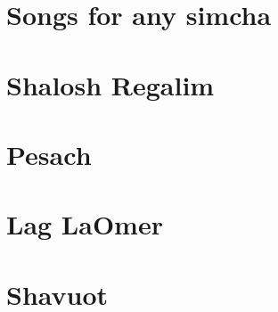 \documentclass[letterpaper]{memoir}
\newcommand{\song}[2]{}
\begin{document}
\chapter{Songs for any simcha}
\song{Eshal Elohai}{Eshal_Elohai.pdf}
\song{Malki Tzuri El Kabir}{Malki_Tzuri_El_Kabir.pdf}
\song{Yahaloma}{Yahaloma.pdf}
\song{Refa Tziri}{Refa_Tziri.pdf}
\song{Lach Ana Orech}{Lach_Ana_Orech.pdf}
\song{Ana b'Chasdecha}{Ana_bChasdecha.pdf}
\song{Eleicha Ekra Yah}{Eleicha_Ekra_Yah.pdf}
\song{N'imah Li}{Nimah_Li.pdf}
\song{Im Ninalu}{Im_Ninalu.pdf}
\song{Nagila Halleluyah}{Nagila_Halleluyah.pdf}
\song{Ani Likrat}{Ani_Likrat.pdf}
\song{Semach Beni B'Chelkecha}{Semach_Beni_BChelkecha.pdf}
\song{Goel Yavo}{Goel_Yavo.pdf}
\song{Ata El Kabir}{Ata_El_Kabir.pdf}
\song{Havivi Yah Havivi}{Havivi_Yah_Havivi.pdf}
\song{Hayyim U'Madon}{Hayyim_UMadon.pdf}
\song{Yerushalyim Ir HaBirah}{Yerushalyim_Ir_HaBirah.pdf}
\song{Boee B'rinah}{Boee_Brinah.pdf}
\song{Yinon Shemo}{Yinon_Shemo.pdf}
\song{El Galil}{El_Galil.pdf}
\song{Yotzer MiYado}{Yotzer_MiYado_2.pdf}
\song{Ozrenei El Chai}{Ozrenei_El_Chai.pdf}
\song{Im HaGolan}{Im_HaGolan.pdf}
\song{Riva Riva}{Riva_Riva.pdf}
\song{Kol Et Eleicha}{Kol_Et_Eleicha.pdf}
\song{Ochil Yom Yom Yerushalyim}{Ochil_Yom_Yom_Yerushalyim.pdf}
\song{Ani Alayich Ayuma}{Ani_Alayich_Ayuma.pdf}
\song{Eli Yah Eli}{Eli_Yah_Eli.pdf} %
\song{L'David Shir U'Mizmor}{LDavid_Shir_uMizmor.pdf}


\chapter{Shalosh Regalim}
\song{Mauzi}{Mauzi.pdf}

\chapter{Pesach}
\song{Yachid Norah}{Yachid_Norah.pdf}
\song{Rachum Atah}{Rachum_Atah.pdf}
\song{B'neh Li Zevul Mishkani}{Bneh_Li_Zevul_Mishkani.pdf}
\song{Emunim Irchu Shevach (Yerushalmi)}{Emunim_Irchu_Shevach_Yerushalyim.pdf}
\song{Emunim Irchu Shevach (Syrian)}{Emunim_Irchu_Shevach_Syrian.pdf}
\song{Mi Yimalel Gevurotecha}{Mi_Yimalel_Gevurotecha.pdf}

\chapter{Lag LaOmer}
\song{V'amartem Ko Lachai}{Vamartem_Ko_Lachai.pdf}

\chapter{Shavuot}
\song{Roe' Ne'eman Hu}{Roe_Neeman_Hu.pdf}
\song{T'nu Kavod LaTorah}{Tnu_Kavod_LaTorah.pdf}
\end{document}
